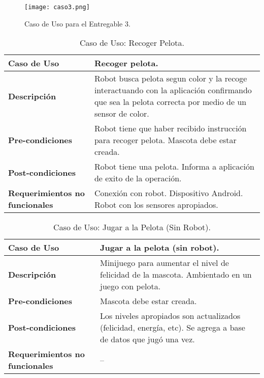\begin{figure}[H]
  \centering
  \texttt{[image: caso3.png]}
  \caption[~Caso de Uso Entregable 3]{Caso de Uso para el Entregable 3.}
  \label{fig:Caso3}
\end{figure}

\begin{table}[htbp!]
  \centering
  \begin{tabular}{|p{4cm}|p{6cm}|}\hline
    \bf{Caso de Uso}                   & Recoger pelota. \\ \hline
    \bf{Descripci\'on}                 & Robot busca pelota segun color y la recoge interactuando con la aplicaci\'on confirmando que sea la pelota correcta por medio de un sensor de color. \\ \hline
    \bf{Pre-condiciones}               & Robot tiene que haber recibido instrucci\'on para recoger pelota. Mascota debe estar creada. \\ \hline
    \bf{Post-condiciones}              & Robot tiene una pelota. Informa a aplicaci\'on de exito de la operaci\'on. \\ \hline
    \bf{Requerimientos no funcionales} & Conexi\'on con robot. Dispositivo Android. Robot con los sensores apropiados. \\ \hline
  \end{tabular}
  \caption[~~Caso de Uso: Recoger Pelota]{Caso de Uso: Recoger Pelota.}
  \label{table:RecogerPelota}
\end{table}

\begin{table}[htbp!]
  \centering
  \begin{tabular}{|p{4cm}|p{6cm}|}\hline
    \bf{Caso de Uso}                   & Jugar a la pelota (sin robot). \\ \hline
    \bf{Descripci\'on}                 & Minijuego para aumentar el nivel de felicidad de la mascota. Ambientado en un juego con pelota.  \\ \hline
    \bf{Pre-condiciones}               & Mascota debe estar creada.  \\ \hline
    \bf{Post-condiciones}              & Los niveles apropiados son actualizados (felicidad, energ\'ia, etc). Se agrega a base de datos que jug\'o una vez.  \\ \hline
    \bf{Requerimientos no funcionales} & -- \\ \hline
  \end{tabular}
  \caption[~~Caso de Uso: Jugar a la Pelota (Sin Robot)]{Caso de Uso: Jugar a la Pelota (Sin Robot).}
  \label{table:JugarPelota-SR}
\end{table}

